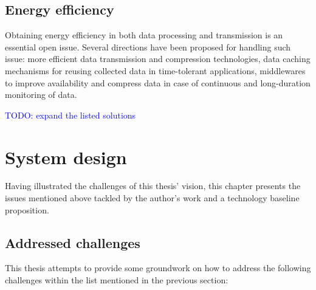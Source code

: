 \subsection{Energy efficiency}

Obtaining energy efficiency in both data processing and transmission is an essential open issue. Several directions have been proposed for handling such issue: more efficient data transmission and compression technologies, data caching mechanisms for reusing collected data in time-tolerant applications, middlewares to improve availability and compress data in case of continuous and long-duration monitoring of data.

\textcolor{blue}{TODO: expand the listed solutions}

\section{System design}
\label{sec:technicals}

Having illustrated the challenges of this thesis' vision, this chapter presents the issues mentioned above tackled by the author's work and a technology baseline proposition.

\subsection{Addressed challenges}

This thesis attempts to provide some groundwork on how to address the following challenges within the list mentioned in the previous section:

